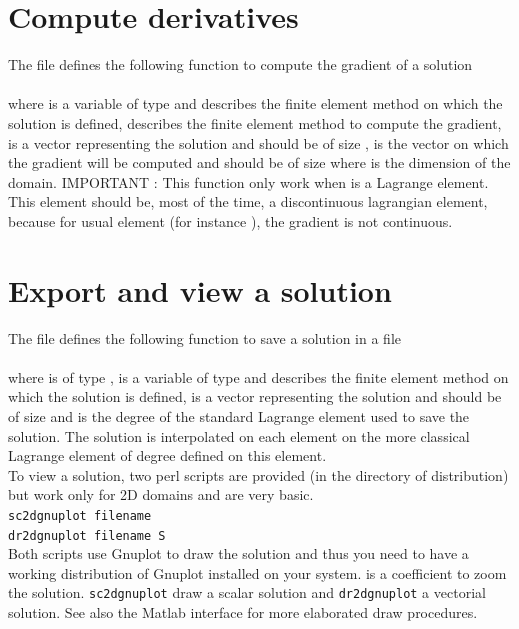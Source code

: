\documentclass[11pt,a4paper]{article}
\begin{document}
\section{Compute derivatives}

The file   defines the following function to compute the gradient of a solution\\[0.5cm]
\\[0.5cm]
where  is a variable of type  and describes the finite element method on which the solution is defined,  describes the finite element method to compute the gradient,  is a vector representing the solution and should be of size ,  is the vector on which the gradient will be computed and should be of size
 where  is the dimension of the domain. IMPORTANT : This function only work when  is a Lagrange element. This element should be, most of the time, a discontinuous lagrangian element, because for usual element (for instance ), the gradient is not continuous.

\section{Export and view a solution}

The file  defines the following function to save a solution in a file\\[0.5cm]
\\[0.5cm]
where  is of type ,   is a variable of type  and describes the finite element method on which the solution is defined,  is a vector representing the solution and should be of size  and  is the degree of the standard Lagrange element used to save the solution. The solution is interpolated on each element on the more classical Lagrange element of degree  defined on this element.\\[0.5cm]
To view a solution, two perl scripts are provided (in the directory  of \gf  distribution) but work only for 2D domains and are very basic.\\[0.5cm]
{\tt sc2dgnuplot filename}\\[0.5cm]
{\tt dr2dgnuplot filename S}\\[0.5cm]
Both scripts use Gnuplot to draw the solution and thus you need to have a working distribution of Gnuplot installed on your system.  is a coefficient to zoom the solution. {\tt sc2dgnuplot} draw a scalar solution and {\tt dr2dgnuplot} a vectorial solution. See also the Matlab interface for more elaborated draw procedures.
\end{document}

